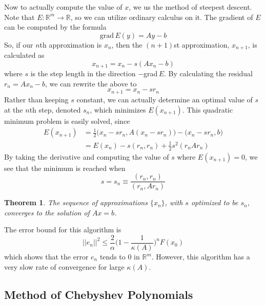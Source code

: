 \documentclass{article}
\newtheorem{theorem}{Theorem}[section]
\theoremstyle{remark}
\theoremstyle{definition}
\begin{document}
    Now to actually compute the value of $x$, we us the method of steepest descent. Note that $E: \mathbb{R}^m \longrightarrow \mathbb{R}$, so we can utilize ordinary calculus on it. The gradient of $E$ can be computed by the formula 
    \[\text{grad}\,E(y) = A y - b\]
    So, if our $n$th approximation is $x_n$, then the $(n+1)$st approximation, $x_{n+1}$, is calculated as
    \[x_{n+1} = x_n - s (Ax_n - b)\]
    where $s$ is the step length in the direction $-$grad$\,E$. By calculating the residual $r_n = A x_n - b$, we can rewrite the above to
    \[x_{n+1} = x_n - s r_n\]
    Rather than keeping $s$ constant, we can actually determine an optimal value of $s$ at the $n$th step, denoted $s_n$, which minimizes $E(x_{n+1})$. This quadratic minimum problem is easily solved, since
    \begin{align*}
        E(x_{n+1}) & = \frac{1}{2} \big(x_n - s r_n, A(x_n - s r_n) \big) - \big( x_n - s r_n, b\big) \\
        & = E(x_n) - s (r_n, r_n) + \frac{1}{2} s^2 (r_n A r_n)
    \end{align*}
    By taking the derivative and computing the value of $s$ where $E (x_{n+1}) = 0$, we see that the minimum is reached when 
    \[s = s_n \equiv \frac{(r_n, r_n)}{(r_n, A r_n)}\]

    \begin{theorem}
    The sequence of approximations $\{x_n\}$, with $s$ optimized to be $s_n$, converges to the solution of $A x = b$. 
    \end{theorem}

    The error bound for this algorithm is 
    \[||e_n||^2 \leq \frac{2}{\alpha} \bigg( 1-\frac{1}{\kappa(A)} \bigg)^n F(x_0)\]
    which shows that the error $e_n$ tends to $0$ in $\mathbb{R}^m$. However, this algorithm has a very slow rate of convergence for large $\kappa(A)$. 

  \subsection{Method of Chebyshev Polynomials}
\end{document}
